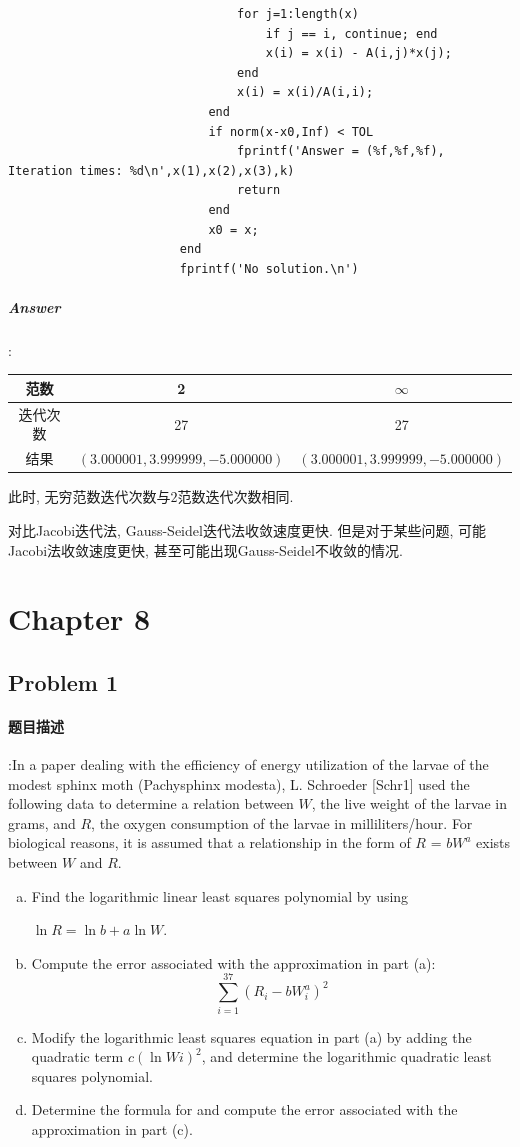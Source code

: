 \documentclass{article}
\begin{document}
\begin{CJK*}{UTF8}{song}
\begin{lstlisting}
								for j=1:length(x)
									if j == i, continue; end
									x(i) = x(i) - A(i,j)*x(j);
								end
								x(i) = x(i)/A(i,i);
							end
							if norm(x-x0,Inf) < TOL
								fprintf('Answer = (%f,%f,%f), Iteration times: %d\n',x(1),x(2),x(3),k)
								return
							end
							x0 = x;
						end
						fprintf('No solution.\n')
					\end{lstlisting}
				\subparagraph{Answer}
					:\newline
					\begin{tabular}{|c|c|c|}
						\hline
						范数    & 2 & $\infty$ \\
						\hline
						迭代次数 & 27 & 27 \\
						\hline
						结果 & $\left(3.000001,3.999999,-5.000000\right)$ & $\left(3.000001,3.999999,-5.000000\right)$\\
						\hline
					\end{tabular}
				
					此时, 无穷范数迭代次数与$2$范数迭代次数相同.
					
					对比Jacobi迭代法, Gauss-Seidel迭代法收敛速度更快. 但是对于某些问题, 可能Jacobi法收敛速度更快, 甚至可能出现Gauss-Seidel不收敛的情况.
	\section{Chapter 8}
		\subsection{Problem 1}
			\paragraph{题目描述}
			:
				In a paper dealing with the efficiency of energy utilization of the larvae of the modest sphinx moth
				(Pachysphinx modesta), L. Schroeder [Schr1] used the following data to determine a relation between
				$W$, the live weight of the larvae in grams, and $R$, the oxygen consumption of the larvae in
				milliliters/hour. For biological reasons, it is assumed that a relationship in the form of $R$ = $bW^a$ exists
				between $W$ and $R$.
				\begin{enumerate}[(a)]
					\item Find the logarithmic linear least squares polynomial by using
					
					$\ln R = \ln b + a \ln W$.
					\item Compute the error associated with the approximation in part (a):
					$$ \sum\limits_{i=1}^{37}\left(R_i-bW_i^a \right)^2$$
					\item Modify the logarithmic least squares equation in part (a) by adding the quadratic term $c(\ln Wi)^2$,
					and determine the logarithmic quadratic least squares polynomial.
					\item Determine the formula for and compute the error associated with the approximation in part (c).
					

\end{enumerate}
\end{CJK*}
\end{document}
